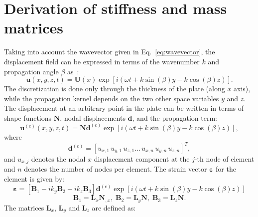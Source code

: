 \documentclass[preprint,12pt]{elsarticle}
\newcommand{\matr}[1]{\mathbf{#1}} %
\newcommand{\vect}[1]{\mathbf{#1}} %
\newcommand{\bs}[1]{\boldsymbol{#1}}
\begin{document}
	 \section{Derivation of stiffness and mass matrices}
	 Taking into account the wavevector given in Eq.~\ref{eq:wavevector}, the displacement field can be expressed in terms of the wavenumber $k$ and propagation angle $\beta$ as~\cite{Taupin2011}:
	  \begin{equation}
	 \vect{u}(x,y,z,t) = \matr{U}(x) \exp \left[ i (\omega t + k \sin (\beta) y - k \cos (\beta) z)\right].
	 \end{equation}
	 The discretization is done only through the thickness of the plate (along $x$ axis), while the propagation kernel depends on the two other space variables $y$ and $z$. The displacement at an arbitrary point in the plate can be written in terms of shape functions $ \matr{N}$, nodal displacements $ \vect{d}$, and the propagation term:
	 \begin{equation}
	 \vect{u}^{(e)}(x,y,z,t) = \matr{N} \vect{d}^{(e)} \exp \left[ i (\omega t + k \sin (\beta) y - k \cos (\beta) z)\right],
	 \end{equation}
	 where
	 \begin{equation}
	 \vect{d}^{(e)} =  \left[ u_{x,1} \, u_{y,1} \, u_{z,1} \ldots  \, u_{x,n} \, u_{y,n} \, u_{z,n} \right]^T,
	 \end{equation}
	 and $u_{x,j}$ denotes the nodal $x$ displacement component at the $j$-th node of element and $n$ denotes the number of nodes per element.
	 The strain vector $\bs{\varepsilon}$ for the element is given by:
	  \begin{equation}
	 \bs{\varepsilon}= \left[ \matr{B}_1 -i k_y \matr{B}_2 -i k_z \matr{B}_3 \right] \vect{d}^{(e)} \exp \left[ i (\omega t + k \sin (\beta) y - k \cos (\beta) z)\right]
	 \end{equation}
	  \begin{equation}
	 \matr{B}_1= \matr{L}_x \matr{N}_{,x},\; \matr{B}_2= \matr{L}_y \matr{N},\; \matr{B}_3= \matr{L}_z \matr{N}.
	 \end{equation}
	 The matrices $ \matr{L}_x $,  $ \matr{L}_y $ and  $ \matr{L}_z $ are defined as:
\end{document}
